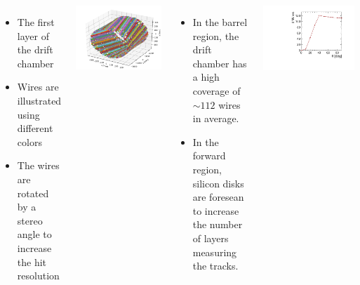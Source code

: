 \documentclass[final,xcolor={dvipsnames,svgnames,x11names,table}]{beamer}
\begin{document}
\begin{frame}
\begin{textblock}{82}
\begin{tcolorbox}[title=The drift chamber]
\begin{columns}
      \begin{itemize}
        \item The first layer of the drift chamber
        \item Wires are illustrated using different colors
        \item The wires are rotated by a stereo angle to increase the hit resolution
      \end{itemize}
      \centering
      \includegraphics[width=\textwidth]{Figures/allHits}

      \begin{itemize}
        \item In the barrel region, the drift chamber has a high coverage of $\sim 112$ wires in average.
        \item In the forward region, silicon disks are foresean to increase the number of layers measuring the tracks.
      \end{itemize}
      \centering
      \includegraphics[width=\textwidth]{Figures/numWires}
  \end{columns}


\end{tcolorbox}
\end{textblock}
\end{frame}
\end{document}
